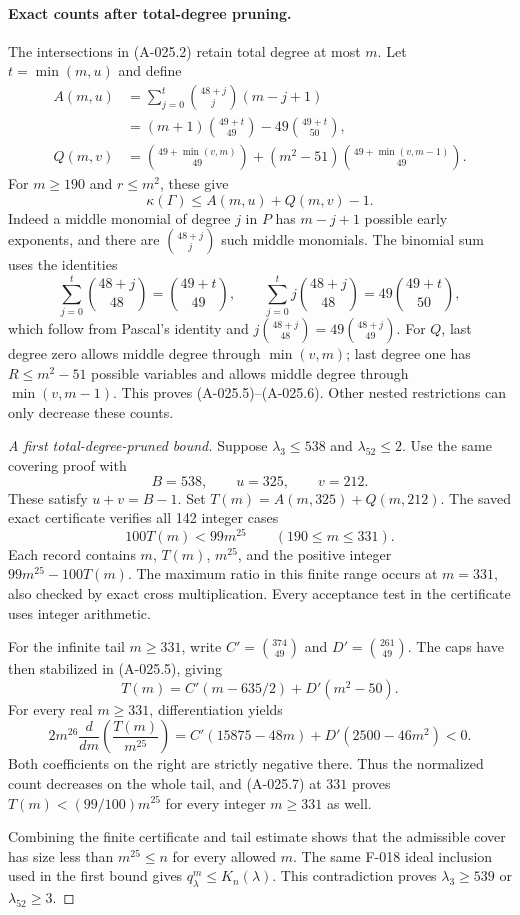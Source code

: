 \paragraph{Exact counts after total-degree pruning.}
The intersections in (A-025.2) retain total degree at most $m$.
Let $t=\min(m,u)$ and define
\[
 \begin{split}
 A(m,u)&=\sum_{j=0}^t\binom{48+j}{j}(m-j+1)\\
       &=(m+1)\binom{49+t}{49}-49\binom{49+t}{50},\\
 Q(m,v)&=\binom{49+\min(v,m)}{49}
        +(m^2-51)\binom{49+\min(v,m-1)}{49}.
 \end{split}                                             \tag{A-025.5}
\]
For $m\geq190$ and $r\leq m^2$, these give
\[
               \kappa(\Gamma)\leq A(m,u)+Q(m,v)-1.        \tag{A-025.6}
\]
Indeed a middle monomial of degree $j$ in $P$ has
$m-j+1$ possible early exponents, and there are
$\binom{48+j}{j}$ such middle monomials. The binomial sum
uses the identities
\[
 \sum_{j=0}^t\binom{48+j}{48}=\binom{49+t}{49},\qquad
 \sum_{j=0}^t j\binom{48+j}{48}=49\binom{49+t}{50},
\]
which follow from Pascal's identity and
$j\binom{48+j}{48}=49\binom{48+j}{49}$.
For $Q$, last degree zero allows middle degree through
$\min(v,m)$; last degree one has $R\leq m^2-51$
possible variables and allows middle degree through
$\min(v,m-1)$. This proves (A-025.5)--(A-025.6).
Other nested restrictions can only decrease these counts.

\begin{proof}[A first total-degree-pruned bound]
Suppose $\lambda_3\leq538$ and $\lambda_{52}\leq2$.
Use the same covering proof with
\[
                       B=538,\qquad u=325,\qquad v=212.
\]
These satisfy $u+v=B-1$. Set $T(m)=A(m,325)+Q(m,212)$.
The saved exact certificate verifies all 142 integer cases
\[
                  100T(m)<99m^{25}
                               \qquad(190\leq m\leq331).       \tag{A-025.7}
\]
Each record contains $m$, $T(m)$, $m^{25}$, and the positive
integer $99m^{25}-100T(m)$. The maximum ratio in this
finite range occurs at $m=331$, also checked by exact
cross multiplication. Every acceptance test in the certificate
uses integer arithmetic.

For the infinite tail $m\geq331$, write
$C'=\binom{374}{49}$ and $D'=\binom{261}{49}$.
The caps have then stabilized in (A-025.5), giving
\[
              T(m)=C'(m-635/2)+D'(m^2-50).
\]
For every real $m\geq331$, differentiation yields
\[
 2m^{26}\frac{d}{dm}\left(\frac{T(m)}{m^{25}}\right)
       =C'(15875-48m)+D'(2500-46m^2)<0.                 \tag{A-025.8}
\]
Both coefficients on the right are strictly negative there.
Thus the normalized count decreases on the whole tail,
and (A-025.7) at $331$ proves $T(m)<(99/100)m^{25}$
for every integer $m\geq331$ as well.

Combining the finite certificate and tail estimate shows
that the admissible cover has size less than $m^{25}\leq n$
for every allowed $m$. The same F-018 ideal inclusion used
in the first bound gives $q^m_\lambda\leq K_n(\lambda)$.
This contradiction proves $\lambda_3\geq539$ or
$\lambda_{52}\geq3$.
\end{proof}

